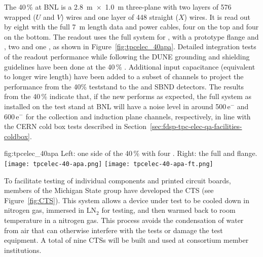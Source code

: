 The \num{40}\,\%  at BNL is a \SI{2.8}{m}~$\times$~\SI{1.0}{m} three-plane  with two layers of \num{576} wrapped ($U$ and $V$) wires and one layer of \num{448} straight ($X$) wires. It is read out by eight   with the full \SI{7}{m}  length data and  power cables, four on the top and four on the bottom. The readout uses the full  system for , with a prototype  flange and , two  and one , as shown in Figure~\ref{fig:tpcelec_40apa}. Detailed integration tests of the  readout performance while following the DUNE grounding and shielding guidelines have been done at the \num{40}\,\% . Additional input capacitance (equivalent to longer wire length) have been added to a subset of channels to project the  performance from the 40\%  teststand to the  and SBND detectors. The results from the \num{40}\,\%  indicate that, if the new  performs as expected, the full  system as installed on the test  stand at BNL will have a noise level in \lar around \num{500}\,e$^-$ and \num{600}\,e$^-$ for the collection and induction plane channels, respectively, in line with the CERN cold box tests described in Section~\ref{sec:fdsp-tpc-elec-qa-facilities-coldbox}.

\begin{dunefigure}
{fig:tpcelec_40apa}
{Left: one side of the \num{40}\,\%  with four .  Right: the full  \fdth and flange.}
\texttt{[image: tpcelec-40-apa.png]}
\hspace{3mm}
\texttt{[image: tpcelec-40-apa-ft.png]}
\end{dunefigure}


To facilitate testing of individual components and printed circuit boards, members of the Michigan State group have developed the CTS (see Figure~\ref{fig:CTS}).  This system allows a device under test to be cooled down in nitrogen gas, immersed in LN$_2$ for testing, and then warmed back to room temperature in a nitrogen gas.  This process avoids the condensation of water from air that can otherwise interfere with the tests or damage the test equipment.  A total of nine CTSs will be built and used at consortium member institutions.

